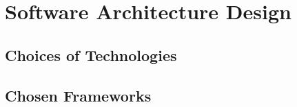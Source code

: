 \documentclass[12pt]{article}
\begin{document}
				
	
	\section{Software Architecture Design}
		\vspace{0.2in}
		
		\subsection{Choices of Technologies}
			\vspace{0.2in}
		
		
		\subsection{Chosen Frameworks}
				
\end{document}
